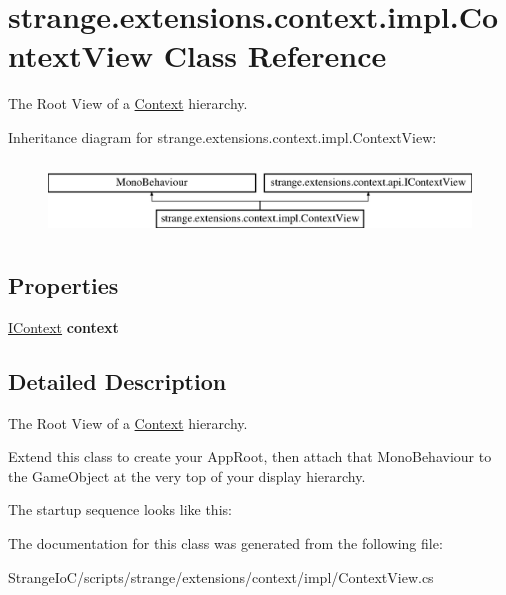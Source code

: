 \hypertarget{classstrange_1_1extensions_1_1context_1_1impl_1_1_context_view}{\section{strange.\-extensions.\-context.\-impl.\-Context\-View Class Reference}
\label{classstrange_1_1extensions_1_1context_1_1impl_1_1_context_view}
}


The Root View of a \hyperlink{classstrange_1_1extensions_1_1context_1_1impl_1_1_context}{Context} hierarchy.  


Inheritance diagram for strange.\-extensions.\-context.\-impl.\-Context\-View\-:\begin{figure}[H]
\begin{center}
\leavevmode
\includegraphics[height=2.000000cm]{classstrange_1_1extensions_1_1context_1_1impl_1_1_context_view}
\end{center}
\end{figure}
\subsection*{Properties}
\begin{DoxyCompactItemize}
\item 
\hypertarget{classstrange_1_1extensions_1_1context_1_1impl_1_1_context_view_ae5bb756aecf7d6e310642b43f2a2af6c}{\hyperlink{interfacestrange_1_1extensions_1_1context_1_1api_1_1_i_context}{I\-Context} {\bfseries context}}\label{classstrange_1_1extensions_1_1context_1_1impl_1_1_context_view_ae5bb756aecf7d6e310642b43f2a2af6c}

\end{DoxyCompactItemize}


\subsection{Detailed Description}
The Root View of a \hyperlink{classstrange_1_1extensions_1_1context_1_1impl_1_1_context}{Context} hierarchy. 

Extend this class to create your App\-Root, then attach that Mono\-Behaviour to the Game\-Object at the very top of your display hierarchy.

The startup sequence looks like this\-: \begin{DoxyVerb}void Awake()
{
    context = new MyContext(this, true);
    context.Start ();
\end{DoxyVerb}
 

The documentation for this class was generated from the following file\-:\begin{DoxyCompactItemize}
\item 
Strange\-Io\-C/scripts/strange/extensions/context/impl/Context\-View.\-cs\end{DoxyCompactItemize}
